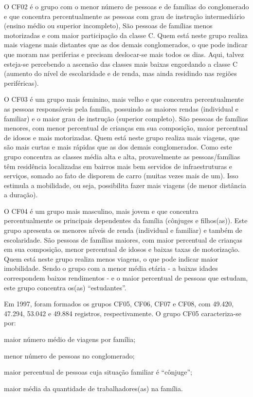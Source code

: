 O CF02 é o grupo com o menor número de pessoas e de famílias do conglomerado e que concentra percentualmente as pessoas com grau de instrução intermediário (ensino médio ou superior incompleto), 
São pessoas de famílias menos motorizadas e com maior participação da classe C.
Quem está neste grupo realiza mais viagens mais distantes que as dos demais conglomerados, o que pode indicar que moram nas periferias e precisam deslocar-se mais todos os dias. 
Aqui, talvez esteja-se percebendo a ascensão das classes mais baixas engordando a classe C (aumento do nível de escolaridade e de renda, mas ainda residindo nas regiões periféricas).

O CF03 é um grupo mais feminino, mais velho e que concentra percentualmente as pessoas responsáveis pela família, possuindo as maiores rendas (individual e familiar) e o maior grau de instrução (superior completo). 
São pessoas de famílias menores, com menor percentual de crianças em sua composição, maior percentual de idosos e mais motorizadas.
Quem está neste grupo realiza mais viagens, que são mais curtas e mais rápidas que as dos demais conglomerados.
Como este grupo concentra as classes média alta e alta, provavelmente as pessoas/famílias têm residência localizadas em bairros mais bem servidos de infraestruturas e serviços, somado ao fato de disporem de carro (muitas vezes mais de um). Isso estimula a mobilidade, ou seja, possibilita fazer mais viagens (de menor distância a duração).

O CF04 é um grupo mais masculino, mais jovem e que concentra percentualmente os principais dependentes da família (cônjuges e filhos(as)). Este grupo apresenta os menores níveis de renda (individual e familiar) e também de escolaridade.
São pessoas de famílias maiores, com maior percentual de crianças em sua composição, menor percentual de idosos e baixas taxas de motorização.
Quem está neste grupo realiza menos viagens, o que pode indicar maior imobilidade.
Sendo o grupo com a menor média etária - a baixas idades correspondem baixos rendimentos - e o maior percentual de pessoas que estudam, este grupo concentra os(as) ``estudantes''.

Em 1997, foram formados os grupos CF05, CF06, CF07 e CF08, com 49.420, 47.294, 53.042 e 49.884 registros, respectivamente.
O grupo CF05 caracteriza-se por:
\begin{compactitem}
\item maior número médio de viagens por família;

\item menor número de pessoas no conglomerado;
\item maior percentual de pessoas cuja situação familiar é ``cônjuge'';

\item maior média da quantidade de trabalhadores(as) na família.
\end{compactitem}

